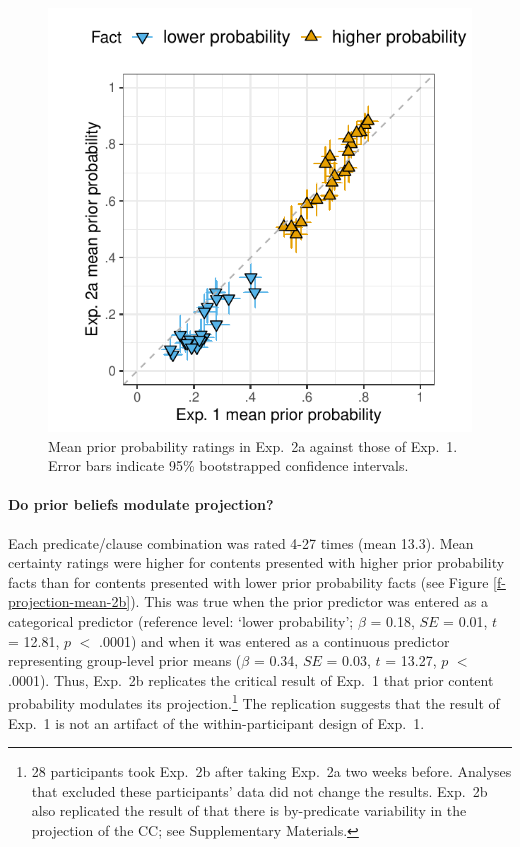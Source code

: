 \documentclass[OpenMind]{stjour}
\begin{document}
\begin{figure}[h!]

\centerline{\includegraphics[width=.4\paperwidth]{../../results/1-prior/graphs/prior-probability-comparison-exp1-exp2}}

\caption{Mean prior probability ratings in Exp.~2a against those of Exp.~1. Error bars indicate 95\% bootstrapped confidence intervals.}
\label{f-prior-comparison}
\end{figure}


\paragraph{Do prior beliefs modulate projection?} Each predicate/clause combination was rated 4-27 times (mean 13.3). Mean certainty ratings were higher for contents  presented with higher prior probability facts than for contents presented with lower prior probability facts (see Figure \ref{f-projection-mean-2b}). This was true when the prior predictor was entered as a categorical predictor (reference level: `lower probability'; $\beta$ = 0.18, $SE$ = 0.01, $t$ = 12.81, $p$ $<$ .0001) and when it was entered as a continuous predictor representing group-level prior means ($\beta$ = 0.34, $SE$ = 0.03, $t$ = 13.27, $p$ $<$ .0001). Thus, Exp.~2b replicates the critical result of Exp.~1 that prior content probability modulates its projection.\footnote{28 participants took Exp.~2b after taking Exp.~2a two weeks before. Analyses that excluded these participants' data did not change the results. Exp.~2b also replicated the result of \cite{tonhauser-degen-factive}  that there is by-predicate variability in the projection of the CC; see Supplementary Materials.}  The replication suggests that the result of Exp.~1 is not an artifact of the within-participant design of Exp.~1.
\end{document}
